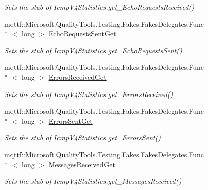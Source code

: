 \begin{DoxyCompactItemize}
\begin{DoxyCompactList}\small\item\em Sets the stub of Icmp\-V4\-Statistics.\-get\-\_\-\-Echo\-Requests\-Received()\end{DoxyCompactList}\item 
mqttf\-::\-Microsoft.\-Quality\-Tools.\-Testing.\-Fakes.\-Fakes\-Delegates.\-Func\\*
$<$ long $>$ \hyperlink{class_system_1_1_net_1_1_network_information_1_1_fakes_1_1_stub_icmp_v4_statistics_ad5d3625e97bd857a1757604f7eb6b3ea}{Echo\-Requests\-Sent\-Get}
\begin{DoxyCompactList}\small\item\em Sets the stub of Icmp\-V4\-Statistics.\-get\-\_\-\-Echo\-Requests\-Sent()\end{DoxyCompactList}\item 
mqttf\-::\-Microsoft.\-Quality\-Tools.\-Testing.\-Fakes.\-Fakes\-Delegates.\-Func\\*
$<$ long $>$ \hyperlink{class_system_1_1_net_1_1_network_information_1_1_fakes_1_1_stub_icmp_v4_statistics_aa561c68e1b5f80915971ad02e08966cd}{Errors\-Received\-Get}
\begin{DoxyCompactList}\small\item\em Sets the stub of Icmp\-V4\-Statistics.\-get\-\_\-\-Errors\-Received()\end{DoxyCompactList}\item 
mqttf\-::\-Microsoft.\-Quality\-Tools.\-Testing.\-Fakes.\-Fakes\-Delegates.\-Func\\*
$<$ long $>$ \hyperlink{class_system_1_1_net_1_1_network_information_1_1_fakes_1_1_stub_icmp_v4_statistics_abd51bdfe1be88bcf1a15548eb48cae9f}{Errors\-Sent\-Get}
\begin{DoxyCompactList}\small\item\em Sets the stub of Icmp\-V4\-Statistics.\-get\-\_\-\-Errors\-Sent()\end{DoxyCompactList}\item 
mqttf\-::\-Microsoft.\-Quality\-Tools.\-Testing.\-Fakes.\-Fakes\-Delegates.\-Func\\*
$<$ long $>$ \hyperlink{class_system_1_1_net_1_1_network_information_1_1_fakes_1_1_stub_icmp_v4_statistics_a1e10ffe9a8c0a16c7a92db4831f3860f}{Messages\-Received\-Get}
\begin{DoxyCompactList}\small\item\em Sets the stub of Icmp\-V4\-Statistics.\-get\-\_\-\-Messages\-Received()\end{DoxyCompactList}\item 

\end{DoxyCompactItemize}
